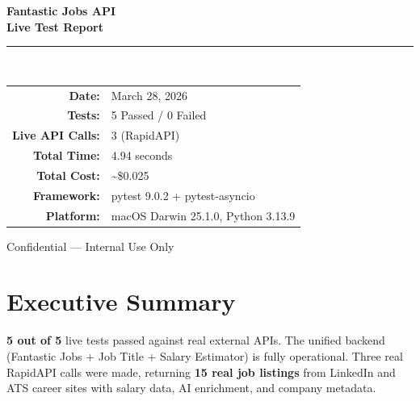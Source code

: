 \documentclass[11pt, a4paper]{article}
\begin{document}
\begin{titlepage}
\begin{center}
\vspace*{4cm}
{\fontsize{38}{46}\selectfont\bfseries\color{primary}Fantastic Jobs API}\\[0.4cm]
{\fontsize{28}{34}\selectfont\bfseries\color{highlight}Live Test Report}\\[2cm]
\textcolor{highlight}{\rule{10cm}{2pt}}\\[1.5cm]
{\large\color{secondary}
\begin{tabular}{rl}
    \textbf{Date:} & March 28, 2026 \\[0.3cm]
    \textbf{Tests:} & 5 Passed / 0 Failed \\[0.3cm]
    \textbf{Live API Calls:} & 3 (RapidAPI) \\[0.3cm]
    \textbf{Total Time:} & 4.94 seconds \\[0.3cm]
    \textbf{Total Cost:} & \textasciitilde\$0.025 \\[0.3cm]
    \textbf{Framework:} & pytest 9.0.2 + pytest-asyncio \\[0.3cm]
    \textbf{Platform:} & macOS Darwin 25.1.0, Python 3.13.9 \\
\end{tabular}}
\vfill
{\small\color{bordergray}Confidential --- Internal Use Only}
\end{center}
\end{titlepage}

\newpage
\tableofcontents
\newpage

\section{Executive Summary}

\begin{successbox}
\textbf{5 out of 5} live tests passed against real external APIs. The unified backend (Fantastic Jobs + Job Title + Salary Estimator) is fully operational. Three real RapidAPI calls were made, returning \textbf{15 real job listings} from LinkedIn and ATS career sites with salary data, AI enrichment, and company metadata.
\end{successbox}
\end{document}
